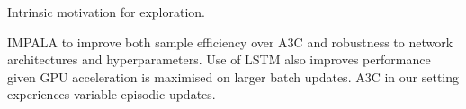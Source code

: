 \documentclass[runningheads]{llncs}
\begin{document}
Intrinsic motivation for exploration.

IMPALA to improve both sample efficiency over A3C and robustness to network architectures and hyperparameters. Use of LSTM also improves performance given GPU acceleration is maximised on larger batch updates. A3C in our setting experiences variable episodic updates.


 
%
%


%
% 
% 
%
\end{document}
